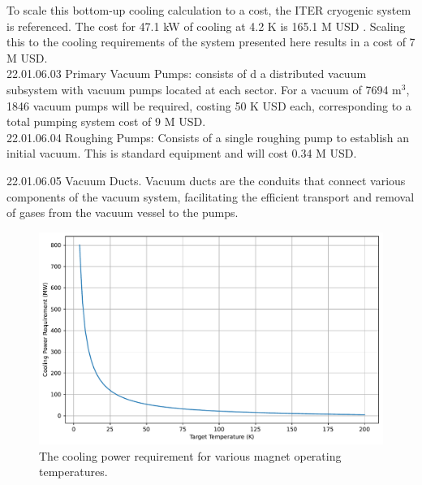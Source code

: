 To scale this bottom-up cooling calculation to a cost, the ITER cryogenic system is referenced. The cost for 47.1 kW of cooling at 4.2 K is 165.1 M USD \cite{waganer2006design, serio2010challenges}. Scaling this to the cooling requirements of the system presented here results in a cost of 7 M USD. \\

22.01.06.03 Primary Vacuum Pumps: consists of d a distributed vacuum subsystem with vacuum pumps located at each sector. For a vacuum of 7694 m$^3$, 1846 vacuum pumps will be required, costing 50 K USD each, corresponding to a total pumping system cost of 9 M USD.\\

22.01.06.04 Roughing Pumps: Consists of a single roughing pump to establish an initial vacuum. This is standard equipment and will cost 0.34 M USD.

22.01.06.05 Vacuum Ducts. Vacuum ducts are the conduits that connect various components of the vacuum system, facilitating the efficient transport and removal of gases from the vacuum vessel to the pumps.

\begin{figure}[h]
    \centering
    \includegraphics[width=0.75\linewidth]{Figures/cooling_efficiency.pdf}
    \caption{The cooling power requirement for various magnet operating temperatures.}
    \label{fig:cool_eff}
\end{figure}